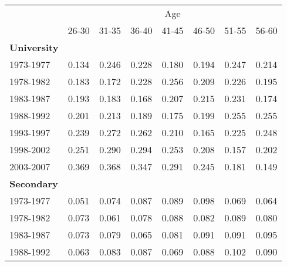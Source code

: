 {\def\sym#1{\ifmmode^{#1}\else\(^{#1}\)\fi} \begin{tabular}{l*{7}{c}} \toprule &\multicolumn{7}{c}{Age}\\ \cmidrule{2-8}
&\multicolumn{1}{c}{26-30}&\multicolumn{1}{c}{31-35}&\multicolumn{1}{c}{36-40}&\multicolumn{1}{c}{41-45}&\multicolumn{1}{c}{46-50}&\multicolumn{1}{c}{51-55}&\multicolumn{1}{c}{56-60}\\
\midrule \textbf{University}\\
\hspace{0.5cm}1973-1977&0.134&0.246&0.228&0.180&0.194&0.247&0.214\\
\hspace{0.5cm}1978-1982&       0.183&       0.172&       0.228&       0.256&       0.209&       0.226&       0.195\\
\hspace{0.5cm}1983-1987&       0.193&       0.183&       0.168&       0.207&       0.215&       0.231&       0.174\\
\hspace{0.5cm}1988-1992&       0.201&       0.213&       0.189&       0.175&       0.199&       0.255&       0.255\\
\hspace{0.5cm}1993-1997&       0.239&       0.272&       0.262&       0.210&       0.165&       0.225&       0.248\\
\hspace{0.5cm}1998-2002&       0.251&       0.290&       0.294&       0.253&       0.208&       0.157&       0.202\\
\hspace{0.5cm}2003-2007&       0.369&       0.368&       0.347&       0.291&       0.245&       0.181&       0.149\\
\textbf{Secondary}  &            &            &            &            &            &            &            \\
\hspace{0.5cm}1973-1977&       0.051&       0.074&       0.087&       0.089&       0.098&       0.069&       0.064\\
\hspace{0.5cm}1978-1982&       0.073&       0.061&       0.078&       0.088&       0.082&       0.089&       0.080\\
\hspace{0.5cm}1983-1987&       0.073&       0.079&       0.065&       0.081&       0.091&       0.091&       0.095\\
\hspace{0.5cm}1988-1992&       0.063&       0.083&       0.087&       0.069&       0.088&       0.102&       0.090\\

\end{tabular}}
